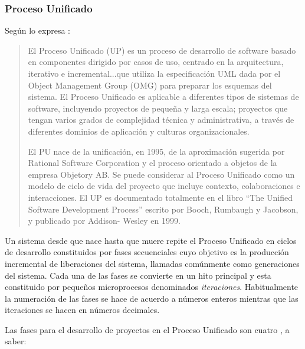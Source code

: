 \subsubsection{Proceso Unificado}
Según lo expresa \cite{alhir2003}:
\begin{quote}
El Proceso Unificado (UP) es un proceso de desarrollo de software basado en componentes dirigido por casos de uso, centrado en la arquitectura, iterativo e incremental...que utiliza la especificación UML dada por el Object Management Group (OMG) para preparar los esquemas del sistema. El Proceso Unificado es aplicable a diferentes tipos de sistemas de software, incluyendo proyectos de pequeña y larga escala; proyectos que tengan varios grados de complejidad técnica y administrativa, a través de diferentes dominios de aplicación y culturas organizacionales.

El PU nace de la unificación, en 1995, de la aproximación sugerida por Rational Software Corporation y el proceso orientado a objetos de la empresa Objetory AB. Se puede considerar al Proceso Unificado como un modelo de ciclo de vida del proyecto que incluye contexto, colaboraciones e interacciones. El UP es documentado totalmente en el libro “The Unified Software Development Process” escrito por Booch, Rumbaugh y Jacobson, y publicado por Addison- Wesley en 1999.\end{quote} 

Un sistema desde que nace hasta que muere repite el Proceso Unificado en ciclos de desarrollo constituidos por fases secuenciales cuyo objetivo es la producción incremental de liberaciones del sistema, llamadas comúnmente como generaciones del sistema. Cada una de las fases se convierte en un hito principal y esta constituido por pequeños microprocesos denominados \textit{iteraciones}. Habitualmente la numeración de las fases se hace de acuerdo a números enteros mientras que las iteraciones se hacen en números decimales. 

Las fases para el desarrollo de proyectos en el Proceso Unificado son cuatro \cite{jacobson2000}, a saber:

